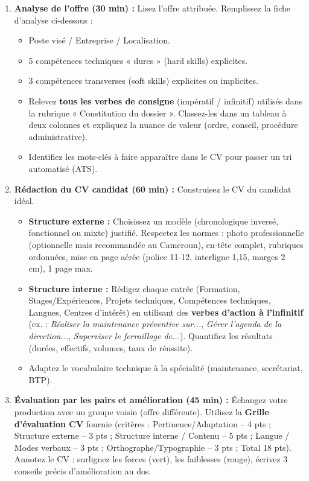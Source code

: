 \documentclass[11pt]{article}
\begin{document}
\begin{enumerate}
    \item \textbf{Analyse de l'offre (30 min) :} Lisez l'offre attribuée. Remplissez la fiche d'analyse ci-dessous :
    \begin{itemize}
        \item Poste visé / Entreprise / Localisation.
        \item 5 compétences techniques « dures » (hard skills) explicites.
        \item 3 compétences transverses (soft skills) explicites ou implicites.
        \item Relevez \textbf{tous les verbes de consigne} (impératif / infinitif) utilisés dans la rubrique « Constitution du dossier ». Classez-les dans un tableau à deux colonnes et expliquez la nuance de valeur (ordre, conseil, procédure administrative).
        \item Identifiez les mots-clés à faire apparaître dans le CV pour passer un tri automatisé (ATS).
    \end{itemize}
    \item \textbf{Rédaction du CV candidat (60 min) :} Construisez le CV du candidat idéal.
    \begin{itemize}
        \item \textbf{Structure externe :} Choisissez un modèle (chronologique inversé, fonctionnel ou mixte) justifié. Respectez les normes : photo professionnelle (optionnelle mais recommandée au Cameroun), en-tête complet, rubriques ordonnées, mise en page aérée (police 11-12, interligne 1,15, marges 2 cm), 1 page max.
        \item \textbf{Structure interne :} Rédigez chaque entrée (Formation, Stages/Expériences, Projets techniques, Compétences techniques, Langues, Centres d'intérêt) en utilisant des \textbf{verbes d'action à l'infinitif} (ex. : \emph{Réaliser la maintenance préventive sur...}, \emph{Gérer l'agenda de la direction...}, \emph{Superviser le ferraillage de...}). Quantifiez les résultats (durées, effectifs, volumes, taux de réussite).
        \item Adaptez le vocabulaire technique à la spécialité (maintenance, secrétariat, BTP).
    \end{itemize}
    \item \textbf{Évaluation par les pairs et amélioration (45 min) :} Échangez votre production avec un groupe voisin (offre différente). Utilisez la \textbf{Grille d'évaluation CV} fournie (critères : Pertinence/Adaptation -- 4 pts ; Structure externe -- 3 pts ; Structure interne / Contenu -- 5 pts ; Langue / Modes verbaux -- 3 pts ; Orthographe/Typographie -- 3 pts ; Total 18 pts). Annotez le CV : surlignez les forces (vert), les faiblesses (rouge), écrivez 3 conseils précis d'amélioration au dos.

\end{enumerate}
\end{document}
